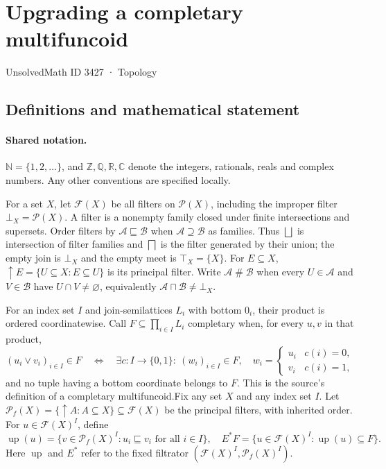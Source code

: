 \documentclass[11pt]{article}
\begin{document}
\setcounter{section}{3426}
\section{Upgrading a completary multifuncoid}\label{3427}
{\small\sffamily UnsolvedMath ID 3427 · Topology}
\subsection{Definitions and mathematical statement}

\paragraph{Shared notation.}$\mathbb N=\{1,2,\ldots\}$, and $\mathbb Z,\mathbb Q,\mathbb R,\mathbb C$ denote the integers, rationals, reals and complex numbers. Any other conventions are specified locally.


For a set $X$, let $\mathcal F(X)$ be all filters on $\mathcal P(X)$, including the improper filter $\bot_X=\mathcal P(X)$. A filter is a nonempty family closed under finite intersections and supersets. Order filters by $\mathcal A\sqsubseteq\mathcal B$ when $\mathcal A\supseteq\mathcal B$ as families. Thus $\bigsqcup$ is intersection of filter families and $\bigsqcap$ is the filter generated by their union; the empty join is $\bot_X$ and the empty meet is $\top_X=\{X\}$. For $E\subseteq X$, $\uparrow E=\{U\subseteq X:E\subseteq U\}$ is its principal filter. Write $\mathcal A\mathrel{\#}\mathcal B$ when every $U\in\mathcal A$ and $V\in\mathcal B$ have $U\cap V\ne\varnothing$, equivalently $\mathcal A\sqcap\mathcal B\ne\bot_X$.

For an index set $I$ and join-semilattices $L_i$ with bottom $0_i$, their product is ordered coordinatewise. Call $F\subseteq\prod_{i\in I}L_i$ completary when, for every $u,v$ in that product,
\[
 (u_i\vee v_i)_{i\in I}\in F
 \quad\Longleftrightarrow\quad
 \exists c:I\to\{0,1\}:\ (w_i)_{i\in I}\in F,
 \quad w_i=\begin{cases}u_i&c(i)=0,\\v_i&c(i)=1,\end{cases}
\]
and no tuple having a bottom coordinate belongs to $F$. This is the source's definition of a completary multifuncoid.Fix any set $X$ and any index set $I$. Let $\mathcal P_f(X)=\{\uparrow A:A\subseteq X\}\subseteq\mathcal F(X)$ be the principal filters, with inherited order. For $u\in\mathcal F(X)^I$, define
\[
 \operatorname{up}(u)=\{v\in\mathcal P_f(X)^I:u_i\sqsubseteq v_i\text{ for all }i\in I\},
 \quad E^*F=\{u\in\mathcal F(X)^I:\operatorname{up}(u)\subseteq F\}.
\]
Here $\operatorname{up}$ and $E^*$ refer to the fixed filtrator $(\mathcal F(X)^I,\mathcal P_f(X)^I)$.
\end{document}
